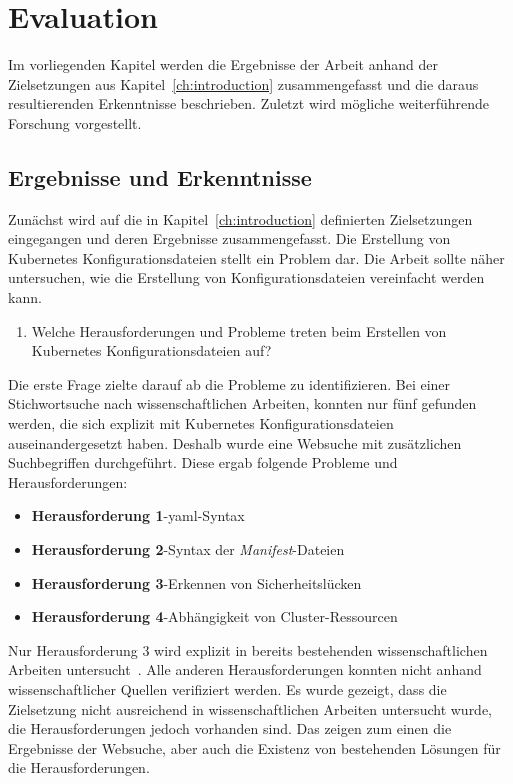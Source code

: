 \chapter{Evaluation}\label{ch:evaluation}

Im vorliegenden Kapitel werden die Ergebnisse der Arbeit anhand der Zielsetzungen aus Kapitel~\ref{ch:introduction} zusammengefasst
und die daraus resultierenden Erkenntnisse beschrieben. Zuletzt wird mögliche weiterführende Forschung vorgestellt.

\section{Ergebnisse und Erkenntnisse}

Zunächst wird auf die in Kapitel~\ref{ch:introduction} definierten Zielsetzungen eingegangen und deren Ergebnisse zusammengefasst.
Die Erstellung von Kubernetes Konfigurationsdateien stellt ein Problem dar.
Die Arbeit sollte näher untersuchen, wie die Erstellung von Konfigurationsdateien vereinfacht werden kann.

\begin{enumerate}
    \item Welche Herausforderungen und Probleme treten beim Erstellen von Kubernetes Konfigurationsdateien auf?
\end{enumerate}
Die erste Frage zielte darauf ab die Probleme zu identifizieren. Bei einer Stichwortsuche nach wissenschaftlichen Arbeiten, konnten nur
fünf gefunden werden, die sich explizit mit Kubernetes Konfigurationsdateien
auseinandergesetzt haben.
Deshalb wurde eine Websuche mit zusätzlichen Suchbegriffen durchgeführt.
Diese ergab folgende Probleme und Herausforderungen:

\begin{itemize}
    \setlength\itemsep{-0.5cm}
    \item \textbf{Herausforderung 1}-\ac{yaml}-Syntax
    \item \textbf{Herausforderung 2}-Syntax der \textit{Manifest}-Dateien
    \item \textbf{Herausforderung 3}-Erkennen von Sicherheitslücken
    \item \textbf{Herausforderung 4}-Abhängigkeit von Cluster-Ressourcen
\end{itemize}
Nur Herausforderung 3 wird explizit in bereits bestehenden wissenschaftlichen Arbeiten untersucht~\cite{9476056,10.1145/3579639,10.1145/3468264.3473495}.
Alle anderen Herausforderungen konnten nicht anhand wissenschaftlicher Quellen verifiziert werden.
Es wurde gezeigt, dass die Zielsetzung nicht ausreichend in wissenschaftlichen Arbeiten untersucht wurde, die Herausforderungen jedoch vorhanden sind.
Das zeigen zum einen die Ergebnisse der Websuche, aber auch die Existenz von bestehenden Lösungen für die Herausforderungen.


